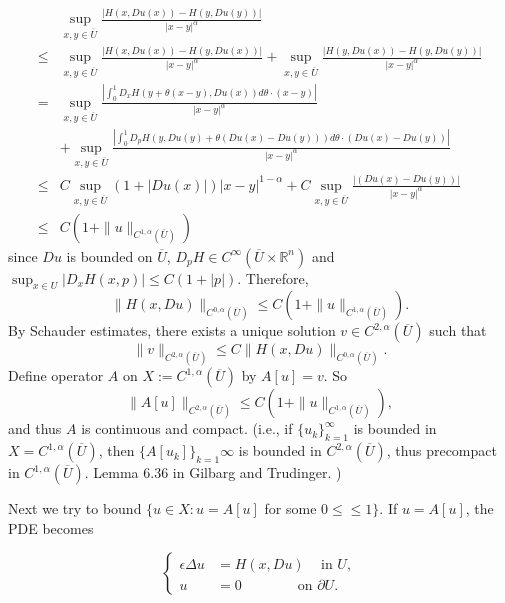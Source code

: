 \documentclass[11pt,reqno]{amsart}
\numberwithin{figure}{section}
\theoremstyle{plain}
\theoremstyle{remark}
\numberwithin{equation}{section}
\begin{document}
\begin{appendices}
\begin{equation}
    \begin{aligned}
  &\sup_{x, y \in \overline{U}}\frac{|H(x, Du(x))-H(y, Du(y))|}{|x-y|^\alpha}\\
  \leq &  \sup_{x, y \in \overline{U}}\frac{|H(x, Du(x))-H(y, Du(x))|}{|x-y|^\alpha} + \sup_{x, y \in \overline{U}}\frac{|H(y, Du(x))-H(y, Du(y))|}{|x-y|^\alpha} \\
  =&    \sup_{x, y \in \overline{U}}\frac{|\int_0^1D_xH(y+\theta (x-y), Du(x))d\theta \cdot (x-y)|}{|x-y|^\alpha}\\& +
     \sup_{x, y \in \overline{U}}\frac{|\int_0^1D_pH(y, Du(y)+\theta (Du(x)-Du(y)))d\theta \cdot (Du(x)-Du(y))|}{|x-y|^\alpha}\\
  \leq &  C\sup_{x, y \in \overline{U}} (1+|Du(x)|)|x-y|^{1-\alpha} +  C \sup_{x, y \in \overline{U}}\frac{| (Du(x)-Du(y))|}{|x-y|^\alpha}\\
 \leq & C(1 + \|u\|_{C^{1,\alpha}(\overline{U})})
    \end{aligned}
\end{equation}
since $Du$ is bounded on $\overline{U}$, $D_pH \in C^\infty (\overline{U} \times \mathbb{R}^n)$ and
$\displaystyle \sup_{x\in U}|D_xH(x,p)|\leq C(1+|p|)$. Therefore,
\begin{equation}
 \|H(x, Du)\|_{C^{0, \alpha}(\overline{U})} \leq C(1 + \|u\|_{C^{1,\alpha}(\overline{U})}).
\end{equation}
By Schauder estimates, there exists a unique solution $v \in C^{2,\alpha }(\overline{U})$ such that
\begin{equation}
\label{schauder}
    \|v\|_{C^{2, \alpha}(\overline{U})} \leq C  \|H(x, Du)\|_{C^{0, \alpha}(\overline{U})}. 
\end{equation}
\noindent Define operator $A$ on $X := C^{1, \alpha} (\overline{U}) $ by $A[u]=v$. So 
\begin{equation}
     \|A[u]\|_{C^{2, \alpha}(\overline{U})} \leq C(1 + \|u\|_{C^{1,\alpha}(\overline{U})}),
\end{equation}
\noindent
 and thus $A$ is continuous and compact. (i.e., if $\{u_k\}_{k=1}^\infty$ is bounded in $X=C^{1, \alpha}(\overline{U})$, then $\{A[u_k]\}_{k=1}\infty$ is bounded in $C^{2,\alpha} (\overline{U})$, thus precompact in $C^{1, \alpha}(\overline{U})$. Lemma 6.36 in Gilbarg and Trudinger. )
 
\noindent Next we try to bound $\{u\in X : u=  A[u]$ for some $0 \leq    \leq 1\}$. If $u=  A[u]$, the PDE becomes
 
\begin{equation}
\label{lamb}
\left\{
  \begin{aligned}
   \epsilon \Delta u &=   H(x, Du) \quad \, \text{in } U, \\
              u &= 0 \qquad \qquad \text{on } \partial U.
  \end{aligned}
\right.
\end{equation}


\end{appendices}
\end{document}
